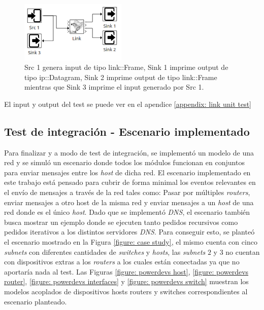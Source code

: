 \documentclass[10pt,a4paper]{article}
\begin{document}
\begin{figure}[!h]
    \centering
    \includegraphics[width = 0.45\textwidth]{img/png/unit_tests/link.png}
    \caption{Src 1 genera input de tipo link::Frame, Sink 1 imprime output de tipo ip::Datagram, Sink 2 imprime output de tipo link::Frame mientras que Sink 3 imprime el input generado por Src 1.}
    \label{figure: unit test link}
\end{figure}

El input y output del test se puede ver en el apendice \ref{appendix: link unit test}

\subsection{Test de integración - Escenario implementado}

Para finalizar y a modo de test de integración, se implementó un modelo de una red y se simuló un escenario donde todos los módulos funcionan en conjuntos para enviar mensajes entre los \textit{host} de dicha red. El escenario implementado en este trabajo está pensado para cubrir de forma minimal los eventos relevantes en el envío de mensajes a través de la red tales como: Pasar por múltiples \textit{routers}, enviar mensajes a otro host de la misma red y enviar mensajes a un \textit{host} de una red donde es el único \textit{host}. Dado que se implementó \textit{DNS}, el escenario también busca mostrar un ejemplo donde se ejecuten tanto pedidos recursivos como pedidos iterativos a los distintos servidores \textit{DNS}. Para conseguir esto, se planteó el escenario mostrado en la Figura \ref{figure: case study}, el mismo cuenta con cinco \textit{subnets} con diferentes cantidades de \textit{switches} y \textit{hosts}, las \textit{subnets} $2$ y $3$ no cuentan con dispositivos extras a los \textit{routers} a los cuales están conectadas ya que no aportaría nada al test. Las Figuras \ref{figure: powerdevs host}, \ref{figure: powerdevs router}, \ref{figure: powerdevs interfaces} y \ref{figure: powerdevs switch} muestran los modelos acoplados de dispositivos hosts routers y switches correspondientes al escenario planteado. \\
\end{document}
